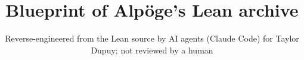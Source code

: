\title{Blueprint of Alpöge's Lean archive}
\author{Reverse-engineered from the Lean source by AI agents (Claude Code) for Taylor Dupuy; not reviewed by a human}
